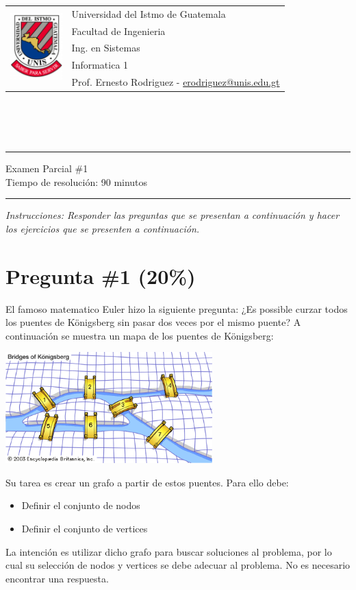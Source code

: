 \documentclass{article}
\newcommand{\horrule}[1]{\rule{\linewidth}{#1}}
\begin{document}
\begin{tabular}{l l}
\multirow{5}{*}{\includegraphics[width=2cm]{../../Recursos/logo.png}} & Universidad del Istmo de Guatemala \\
 & Facultad de Ingenieria \\
 & Ing. en Sistemas \\
 & Informatica 1 \\
 & Prof. Ernesto Rodriguez - \href{mailto:erodriguez@unis.edu.gt}{erodriguez@unis.edu.gt} \\
\end{tabular}
\\\\\\

\begin{center}
        \horrule{0.5pt}
        \huge{Examen Parcial \#1} \\
        \large{Tiempo de resoluci\'on: 90 minutos} \\
        \horrule{1pt}
\end{center}

\emph{Instrucciones: Responder las preguntas que se presentan a continuaci\'on y hacer los ejercicios que se presenten
        a continuaci\'on.}


\section{Pregunta \#1 (20\%)}
El famoso matematico Euler hizo la siguiente pregunta: ¿Es possible curzar todos los puentes
de K\"onigsberg sin pasar dos veces por el mismo puente? A continuaci\'on se muestra un
mapa de los puentes de K\"onigsberg:
\begin{center}
\includegraphics[width=8cm]{bridges.png}
\end{center}
Su tarea es crear un grafo a partir de estos puentes. Para ello debe:
\begin{itemize}
        \item{Definir el conjunto de nodos}
        \item{Definir el conjunto de vertices}
\end{itemize}
La intenci\'on es utilizar dicho grafo para buscar soluciones al
problema, por lo cual su selecci\'on de nodos y vertices se debe
adecuar al problema. No es necesario encontrar una respuesta.
\end{document}

